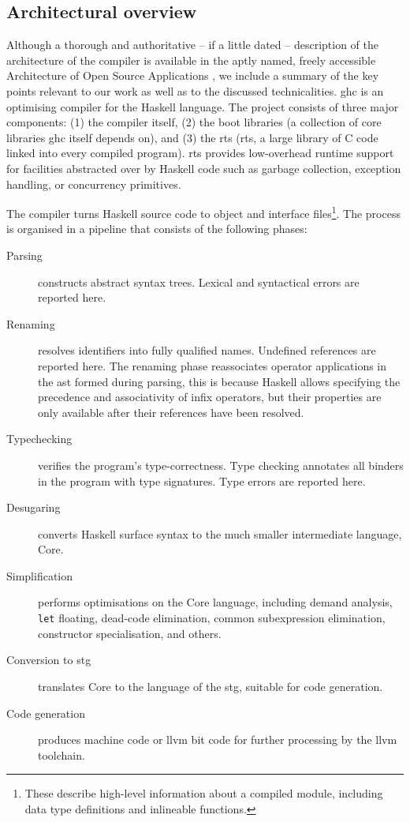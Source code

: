\documentclass[thesis=B,english]{FITthesis}[2019/12/23]
\newcommand{\hsCode}[1]{\texttt{#1}}
\begin{document}
\subsection{Architectural overview}
Although a thorough and authoritative -- if a little dated -- description of
the architecture of the compiler is available in the aptly named, freely
accessible Architecture of Open Source Applications \cite{arch-ghc}, we include
a summary of the key points relevant to our work as well as to the discussed
technicalities. \acrshort{ghc} is an optimising compiler for the Haskell
language. The project consists of three major components: (1) the compiler
itself, (2) the boot libraries (a collection of core libraries \acrshort{ghc}
itself depends on), and (3) the \acrlong{rts} (\acrshort{rts}, a large library
of C code linked into every compiled program). \acrshort{rts} provides
low-overhead runtime support for facilities abstracted over by Haskell code
such as garbage collection, exception handling, or concurrency primitives.

The compiler turns Haskell source code to object and interface files\footnote{
These describe high-level information about a compiled module, including data
type definitions and in\-line\-able functions.}. The process is organised in
a pipeline that consists of the following phases:

\begin{description}
	\item[Parsing] constructs abstract syntax trees. Lexical and syntactical
		errors are reported here.
	\item[Renaming] resolves identifiers into fully qualified names. Undefined
		references are reported here. The renaming phase re\-associates
		operator applications in the \acrshort{ast} formed during parsing, this
		is because Haskell allows specifying the precedence and associativity
		of infix operators, but their properties are only available after
		their references have been resolved.
	\item[Typechecking] verifies the program's type-correctness. Type checking
		annotates all binders in the program with type signatures.  Type errors
		are reported here.
	\item[Desugaring] converts Haskell surface syntax to the much smaller
		intermediate language, Core.
	\item[Simplification] performs optimisations on the Core language,
		including demand analysis, \hsCode{let} floating, dead-code
		elimination, common subexpression elimination, constructor
		specialisation, and others.
	\item[Conversion to \acrshort{stg}] translates Core to the language of the
		\acrlong{stg}, suitable for code generation.
	\item[Code generation] produces machine code or \acrshort{llvm} bit code
		for further processing by the \acrshort{llvm} toolchain.
\end{description}
\end{document}
